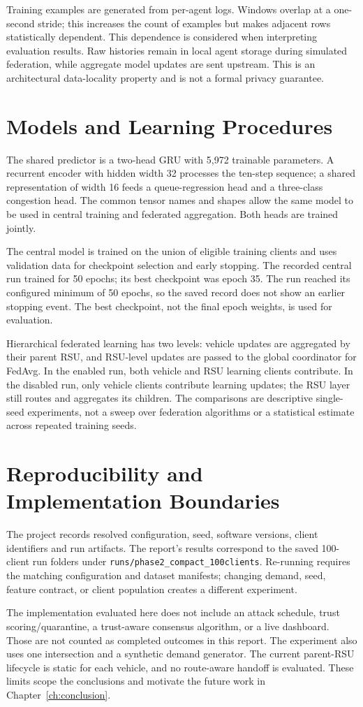 Training examples are generated from per-agent logs. Windows overlap at a one-second stride; this increases the count of examples but makes adjacent rows statistically dependent. This dependence is considered when interpreting evaluation results. Raw histories remain in local agent storage during simulated federation, while aggregate model updates are sent upstream. This is an architectural data-locality property and is not a formal privacy guarantee.

\section{Models and Learning Procedures}
The shared predictor is a two-head GRU with 5,972 trainable parameters. A recurrent encoder with hidden width 32 processes the ten-step sequence; a shared representation of width 16 feeds a queue-regression head and a three-class congestion head. The common tensor names and shapes allow the same model to be used in central training and federated aggregation. Both heads are trained jointly.

The central model is trained on the union of eligible training clients and uses validation data for checkpoint selection and early stopping. The recorded central run trained for 50 epochs; its best checkpoint was epoch 35. The run reached its configured minimum of 50 epochs, so the saved record does not show an earlier stopping event. The best checkpoint, not the final epoch weights, is used for evaluation.

Hierarchical federated learning has two levels: vehicle updates are aggregated by their parent RSU, and RSU-level updates are passed to the global coordinator for FedAvg. In the enabled run, both vehicle and RSU learning clients contribute. In the disabled run, only vehicle clients contribute learning updates; the RSU layer still routes and aggregates its children. The comparisons are descriptive single-seed experiments, not a sweep over federation algorithms or a statistical estimate across repeated training seeds.

\section{Reproducibility and Implementation Boundaries}
The project records resolved configuration, seed, software versions, client identifiers and run artifacts. The report's results correspond to the saved 100-client run folders under \texttt{runs/phase2\_compact\_100clients}. Re-running requires the matching configuration and dataset manifests; changing demand, seed, feature contract, or client population creates a different experiment.

The implementation evaluated here does not include an attack schedule, trust scoring/quarantine, a trust-aware consensus algorithm, or a live dashboard. Those are not counted as completed outcomes in this report. The experiment also uses one intersection and a synthetic demand generator. The current parent-RSU lifecycle is static for each vehicle, and no route-aware handoff is evaluated. These limits scope the conclusions and motivate the future work in Chapter~\ref{ch:conclusion}.
